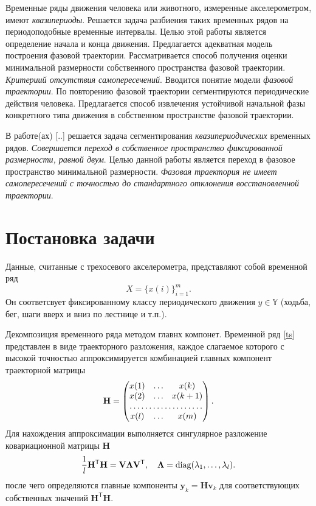 \documentclass[12pt, twoside]{article}
\begin{document}
Временные ряды движения человека или животного, измеренные акселерометром, имеют \emph{квазипериоды}. Решается задача разбиения таких временных рядов на периодоподобные временные интервалы. Целью этой работы является определение начала и конца движения. Предлагается адекватная модель построения фазовой траектории. Рассматривается способ получения оценки минимальной размерности собственного пространства фазовой траектории. \emph{Критериий отсутствия самопересечений}. Вводится понятие модели \emph{фазовой траектории}. По повторению фазовой траектории сегментируются периодические действия человека. Предлагается способ извлечения устойчивой начальной фазы конкретного типа движения в собственном пространстве фазовой траектории.

В работе(ах) \cite{motrenko2015extracting} [..] решается задача сегментирования \emph{квазипериодических} временных рядов. \emph{Совершается переход в собственное пространство фиксированной размерности, равной двум}. Целью данной работы является переход в фазовое пространство минимальной размерности. \emph{Фазовая траектория не имеет самопересечений с точностью до стандартного отклонения восстановленной траектории}.

\section{Постановка задачи}
Данные, считанные с трехосевого акселерометра, представляют собой временной ряд 
    \begin{equation}\label{ts}
        X = \{ x(i) \}_{i = 1}^{m}.
    \end{equation}  
Он соответсвует фиксированному классу периодического движения $y\in\mathbb{Y}$ (ходьба, бег, шаги вверх и вниз по лестнице и т.п.).

Декомпозиция временного ряда методом главнх компонет. Временной ряд \eqref{ts} представлен в виде траекторного разложения, каждое слагаемое которого с высокой точностью аппроксимируется комбинацией главных компонент траекторной матрицы
    \[ \mathbf{H} = \begin{pmatrix}
                        x(1) & \dots & x(k) \\
                        x(2) & \dots & x(k+1) \\
                        \hdotsfor{3} \\
                        x(l) & \dots & x(m)
                    \end{pmatrix}.\]
Для нахождения аппроксимации выполняется сингулярное разложение ковариационной матрицы $\mathbf{H}$
    \[ \frac{1}{l}\mathbf{H}^{\mathsf{T}}\mathbf{H} = \mathbf{V}\mathbf{\Lambda}\mathbf{V}^{\mathsf{T}}, \quad \mathbf{\Lambda} = \diag(\lambda_1,\dots,\lambda_l). \]
    после чего определяются главные компоненты $\mathbf{y}_k = \mathbf{Hv}_k$ для соответствующих собственных значений $\mathbf{H}^{\mathsf{T}}\mathbf{H}$.
\end{document}
